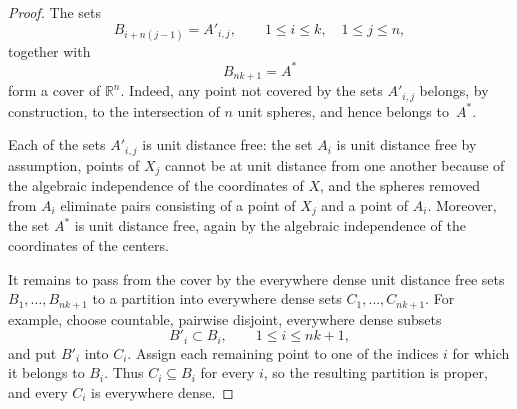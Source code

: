 \documentclass[10pt,a4paper]{amsart}
\begin{document}
\begin{proof}
The sets
\[
    B_{i+n(j-1)}=A'_{i,j},
    \qquad 1\leq i\leq k,\quad 1\leq j\leq n,
\]
together with
\[
    B_{nk+1}=A^*
\]
form a cover of $\mathbb{R}^n$. Indeed, any point not covered by the sets
$A'_{i,j}$ belongs, by construction, to the intersection of $n$ unit
spheres, and hence belongs to~$A^*$.

Each of the sets $A'_{i,j}$ is unit distance free: the set $A_i$ is
unit distance free by assumption, points of $X_j$ cannot be at unit
distance from one another because of the algebraic independence of the
coordinates of $X$, and the spheres removed from $A_i$ eliminate pairs
consisting of a point of $X_j$ and a point of $A_i$. Moreover, the set
$A^*$ is unit distance free, again by the algebraic independence of the
coordinates of the centers.

It remains to pass from the cover by the everywhere dense
unit distance free sets
$B_1,\dots,B_{nk+1}$ to a partition into everywhere dense sets
$C_1,\dots,C_{nk+1}$. For example, choose countable, pairwise disjoint,
everywhere dense subsets
\[
    B'_i\subset B_i,\qquad 1\leq i\leq nk+1,
\]
and put $B'_i$ into $C_i$. Assign each remaining point to one of the
indices $i$ for which it belongs to $B_i$. Thus $C_i\subseteq B_i$ for
every $i$, so the resulting partition is proper, and every $C_i$ is
everywhere dense.
\end{proof}
\end{document}

